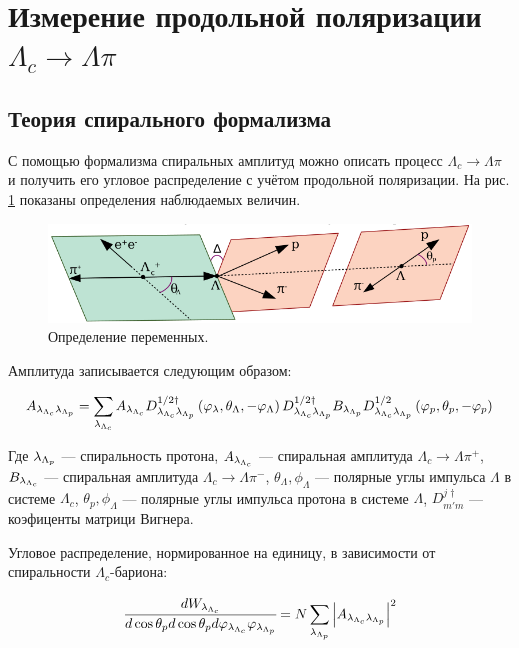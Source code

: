 \section{Измерение продольной поляризации $\Lambda_c \to \Lambda \pi$}
\label{helisity:Lambda}
\subsection{Теория спирального формализма}

С помощью формализма спиральных амплитуд \textbf{\cite{Richman}} можно описать процесс 
$\Lambda_c \to \Lambda \pi$ и получить его угловое распределение с 
учётом продольной поляризации. На рис. \ref{def:val} показаны определения 
наблюдаемых величин. 

\begin{figure}[H]
    \centering
    \includegraphics[width=0.7\linewidth]{img/lpi_def.png}
    \caption{Определение переменных.}
    \label{def:val}
\end{figure}

Амплитуда записывается следующим образом:

\begin{equation}
    A_{\lambda_{\Lambda_{c}} \lambda_{\Lambda_{p}}} = \sum_{\lambda_{\Lambda_{c}}} A_{\lambda_{\Lambda_{c}}} D^{1/2\dag}_{\lambda_{\Lambda_{c}} \lambda_{\Lambda_{p}}}\left(\varphi_\lambda, \theta_\Lambda, -\varphi_\Lambda \right) D^{1/2\dag}_{\lambda_{\Lambda_{c}} \lambda_{\Lambda_{p}}} B_{\lambda_{\Lambda_{p}}} D^{1/2}_{\lambda_{\Lambda_{c}} \lambda_{\Lambda_{p}}}\left(\varphi_p, \theta_p, -\varphi_p \right)
    \label{helisity:amplitud:Lam}
\end{equation}

Где $\lambda_{\Lambda_{p}}$ --- спиральность протона, 
$A_{\lambda_{\Lambda_{c}}}$ --- спиральная амплитуда $\Lambda_c \to \Lambda \pi^+$, 
$B_{\lambda_{\Lambda_{c}}}$ --- спиральная амплитуда $\Lambda_c \to \Lambda \pi^-$,
$\theta_\Lambda, \phi_\Lambda$ --- полярные углы импульса $\Lambda$ в системе $\Lambda_c$,
$\theta_p, \phi_\Lambda$ --- полярные углы импульса протона в системе $\Lambda$, 
$D^{j\dag}_{m' m}$ --- коэфиценты матрици Вигнера.

Угловое распределение, нормированное на единицу, в зависимости от
спиральности $\Lambda_c$-бариона:

\begin{equation}
    \cfrac{dW_{\lambda_{\Lambda_{c}}}}{d\cos{\theta_p}d\cos{\theta_p}d\varphi_{\lambda_{\Lambda_{c}}}\varphi_{\lambda_{\Lambda_{p}}}} = N \sum_{\lambda_{\Lambda_{p}}} \abs{A_{\lambda_{\Lambda_{c}} \lambda_{\Lambda_{p}}}}^2 
\end{equation}

